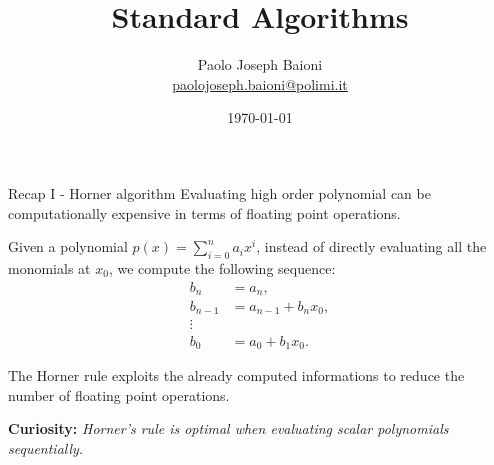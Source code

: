\documentclass[10pt,aspectratio=169]{beamer}
\begin{document}
    \title{Standard Algorithms}
\author{Paolo Joseph Baioni\\ \href{mailto:paolojoseph.baioni@polimi.it}{\color{blue}paolojoseph.baioni@polimi.it}}
\date{\today}
    
\begin{frame}
    \maketitle
\end{frame}

\begin{frame}{Recap I - Horner algorithm}
	Evaluating high order polynomial can be computationally expensive in terms of floating point operations. \\
	
	\medskip
	
Given a polynomial $\displaystyle p(x) = \sum_{i=0}^{n} a_i x^i$, instead of directly evaluating all the monomials at $x_0$, we compute the following sequence:
\begin{equation*} 
\begin{aligned}
	b_n &= a_n, \\
	b_{n-1} &= a_{n-1} + b_n x_0, \\
	\vdots \\
	b_{0} &= a_{0} + b_1 x_0.
\end{aligned}
\end{equation*}

	The Horner rule exploits the already computed informations to reduce the number of floating point operations.\\
	
	\medskip
	
	\textbf{Curiosity:} \textit{ Horner's rule is optimal when evaluating scalar polynomials sequentially.}
\end{frame}
\end{document}
